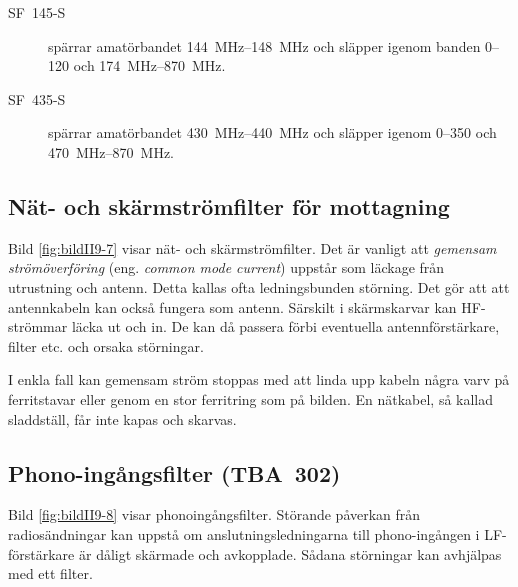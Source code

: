 \begin{description}
\item[SF~145-S] spärrar amatörbandet \SIrange{144}{148}{\mega\hertz} och släpper
igenom banden 0--120 och \SIrange{174}{870}{\mega\hertz}.

\item[SF~435-S] spärrar amatörbandet \SIrange{430}{440}{\mega\hertz} och släpper
igenom 0--350 och \SIrange{470}{870}{\mega\hertz}.
\end{description}

\subsection{Nät- och skärmströmfilter för mottagning}


Bild \ref{fig:bildII9-7} visar nät- och skärmströmfilter.
Det är vanligt att \emph{gemensam strömöverföring} (eng.
\emph{common mode current}) uppstår som läckage från utrustning och antenn.
Detta kallas ofta ledningsbunden störning.
Det gör att att antennkabeln kan också fungera som antenn.
Särskilt i skärmskarvar kan HF-strömmar läcka ut och in.
De kan då passera förbi eventuella antennförstärkare, filter etc. och orsaka
störningar.

I enkla fall kan gemensam ström stoppas med att linda upp kabeln några varv på
ferritstavar eller genom en stor ferritring som på bilden.
En nätkabel, så kallad sladdställ, får inte kapas och skarvas.

\subsection{Phono-ingångsfilter (TBA~302)}



Bild \ref{fig:bildII9-8} visar phonoingångsfilter.
Störande påverkan från radiosändningar kan uppstå om anslutningsledningarna
till phono-ingången i LF-förstärkare är dåligt skärmade och avkopplade.
Sådana störningar kan avhjälpas med ett filter.

